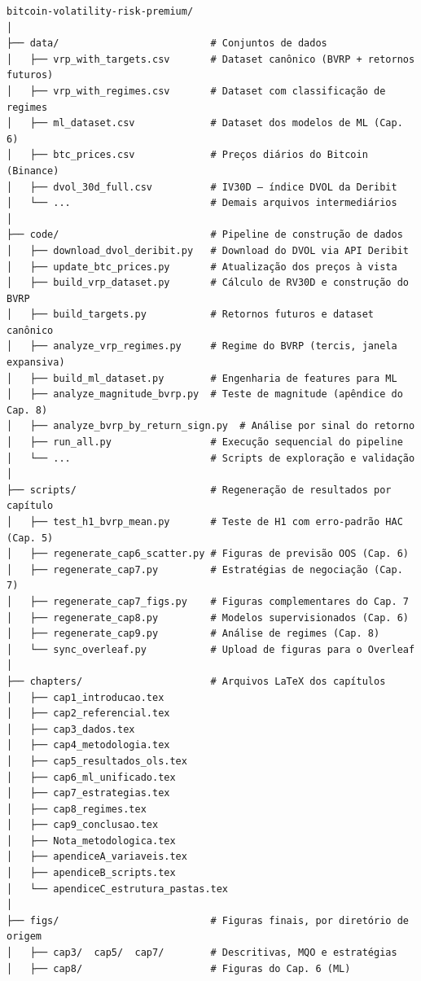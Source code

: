 \begin{verbatim}
bitcoin-volatility-risk-premium/
│
├── data/                          # Conjuntos de dados
│   ├── vrp_with_targets.csv       # Dataset canônico (BVRP + retornos futuros)
│   ├── vrp_with_regimes.csv       # Dataset com classificação de regimes
│   ├── ml_dataset.csv             # Dataset dos modelos de ML (Cap. 6)
│   ├── btc_prices.csv             # Preços diários do Bitcoin (Binance)
│   ├── dvol_30d_full.csv          # IV30D — índice DVOL da Deribit
│   └── ...                        # Demais arquivos intermediários
│
├── code/                          # Pipeline de construção de dados
│   ├── download_dvol_deribit.py   # Download do DVOL via API Deribit
│   ├── update_btc_prices.py       # Atualização dos preços à vista
│   ├── build_vrp_dataset.py       # Cálculo de RV30D e construção do BVRP
│   ├── build_targets.py           # Retornos futuros e dataset canônico
│   ├── analyze_vrp_regimes.py     # Regime do BVRP (tercis, janela expansiva)
│   ├── build_ml_dataset.py        # Engenharia de features para ML
│   ├── analyze_magnitude_bvrp.py  # Teste de magnitude (apêndice do Cap. 8)
│   ├── analyze_bvrp_by_return_sign.py  # Análise por sinal do retorno
│   ├── run_all.py                 # Execução sequencial do pipeline
│   └── ...                        # Scripts de exploração e validação
│
├── scripts/                       # Regeneração de resultados por capítulo
│   ├── test_h1_bvrp_mean.py       # Teste de H1 com erro-padrão HAC (Cap. 5)
│   ├── regenerate_cap6_scatter.py # Figuras de previsão OOS (Cap. 6)
│   ├── regenerate_cap7.py         # Estratégias de negociação (Cap. 7)
│   ├── regenerate_cap7_figs.py    # Figuras complementares do Cap. 7
│   ├── regenerate_cap8.py         # Modelos supervisionados (Cap. 6)
│   ├── regenerate_cap9.py         # Análise de regimes (Cap. 8)
│   └── sync_overleaf.py           # Upload de figuras para o Overleaf
│
├── chapters/                      # Arquivos LaTeX dos capítulos
│   ├── cap1_introducao.tex
│   ├── cap2_referencial.tex
│   ├── cap3_dados.tex
│   ├── cap4_metodologia.tex
│   ├── cap5_resultados_ols.tex
│   ├── cap6_ml_unificado.tex
│   ├── cap7_estrategias.tex
│   ├── cap8_regimes.tex
│   ├── cap9_conclusao.tex
│   ├── Nota_metodologica.tex
│   ├── apendiceA_variaveis.tex
│   ├── apendiceB_scripts.tex
│   └── apendiceC_estrutura_pastas.tex
│
├── figs/                          # Figuras finais, por diretório de origem
│   ├── cap3/  cap5/  cap7/        # Descritivas, MQO e estratégias
│   ├── cap8/                      # Figuras do Cap. 6 (ML)

\end{verbatim}
